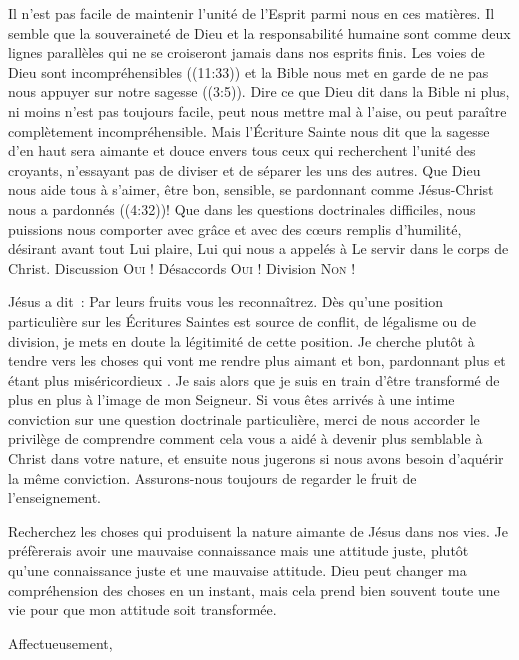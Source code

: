Il n'est pas facile de maintenir l'unité de l'Esprit parmi nous en ces matières.
 Il semble que la souveraineté de Dieu et la responsabilité humaine
 sont comme deux lignes parallèles qui ne se croiseront jamais dans nos esprits finis.
 Les voies de Dieu sont \og incompréhensibles \fg{} ((11:33))
 et la Bible nous met en garde de \og ne pas nous appuyer sur notre sagesse \fg{}
 ((3:5)).
 Dire ce que Dieu dit dans la Bible \ocadr ni plus, ni moins \fcadr{} n'est pas toujours facile,
 peut nous mettre mal à l'aise, ou peut paraître complètement incompréhensible.
 Mais l'Écriture Sainte nous dit que la sagesse d'en haut sera aimante
 et douce envers tous ceux qui recherchent l'unité des croyants,
 n'essayant pas de diviser et de séparer les uns des autres.
 Que Dieu nous aide tous à s'aimer, être bon, sensible, se pardonnant comme Jésus-Christ
 nous a pardonnés ((4:32))!
 Que dans les questions doctrinales difficiles, nous puissions nous comporter avec grâce
 et avec des cœurs remplis d'humilité, désirant avant tout Lui plaire,
 Lui qui nous a appelés à Le servir dans le corps de Christ.
 Discussion \ocadr \textsc{Oui} !
 Désaccords \ocadr \textsc{Oui} !
 Division \ocadr \textsc{Non} !

Jésus a dit~: \og Par leurs fruits vous les reconnaîtrez. \fg{}
 Dès qu'une position particulière sur les Écritures Saintes
 est source de conflit, de légalisme ou de division,
 je mets en doute la légitimité de cette position.
 Je cherche plutôt à tendre vers les choses qui vont me rendre plus aimant et bon,
 pardonnant plus et étant plus miséricordieux .
 Je sais alors que je suis en train d'être transformé de plus
 en plus à l'image de mon Seigneur.
Si vous êtes arrivés à une intime conviction sur une question doctrinale particulière,
 merci de nous accorder le privilège de comprendre comment cela vous a aidé à devenir
 plus semblable à Christ dans votre nature, et ensuite nous jugerons
 si nous avons besoin d'aquérir la même conviction.
 Assurons-nous toujours de regarder le fruit de l'enseignement.

Recherchez les choses qui produisent la nature aimante de Jésus dans nos vies.
 Je préfèrerais avoir une mauvaise connaissance mais une attitude juste,
 plutôt qu'une connaissance juste et une mauvaise attitude.
 Dieu peut changer ma compréhension des choses en un instant,
 mais cela prend bien souvent toute une vie pour que mon attitude
 soit transformée.

Affectueusement,

\signature{Chuck Smith}


